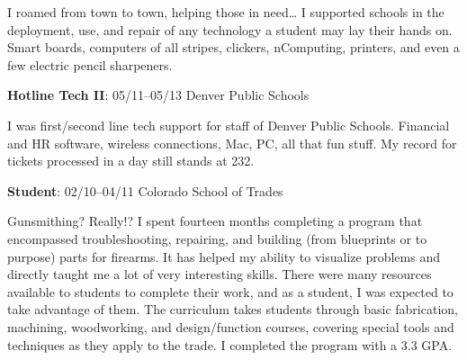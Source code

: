 \documentclass[letterpaper,12pt]{article}
\begin{document}
I roamed from town to town, helping those in need\ldots{} I supported schools in
the deployment, use, and repair of any technology a student may lay their hands
on. Smart boards, computers of all stripes, clickers, nComputing, printers, and
even a few electric pencil sharpeners.

\begin{flushleft}
\textbf{Hotline Tech II}: 05/11--05/13 Denver Public Schools
\end{flushleft}

I was first/second line tech support for staff of Denver Public Schools.
Financial and HR software, wireless connections, Mac, PC, all that fun stuff.
My record for tickets processed in a day still stands at 232.

\begin{flushleft}
\textbf{Student}: 02/10--04/11 Colorado School of Trades
\end{flushleft}

Gunsmithing? Really!? I spent fourteen months completing a program that
encompassed troubleshooting, repairing, and building (from blueprints or to
purpose) parts for firearms. It has helped my ability to visualize problems
and directly taught me a lot of very interesting skills. There were many
resources available to students to complete their work, and as a student, I
was expected to take advantage of them. The curriculum takes students through
basic fabrication, machining, woodworking, and design/function courses,
covering special tools and techniques as they apply to the trade. I completed
the program with a 3.3 GPA.
\end{document}
